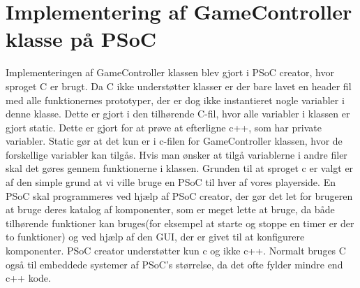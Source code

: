 \documentclass[Softwaredesign/Softwaredesign_main.tex]{subfiles}
\begin{document}
\section{Implementering af GameController klasse på PSoC}\label{sec:GameController_implementering_bilag}
Implementeringen af GameController klassen blev gjort i PSoC creator, hvor sproget C er brugt. Da C ikke understøtter klasser er der bare lavet en header fil med alle funktionernes prototyper, der er dog ikke instantieret nogle variabler i denne klasse. Dette er gjort i den tilhørende C-fil, hvor alle variabler i klassen er gjort static. Dette er gjort for at prøve at efterligne c++, som har private variabler. Static gør at det kun er i c-filen for GameController klassen, hvor de forskellige variabler kan tilgås. Hvis man ønsker at tilgå variablerne i andre filer skal det gøres gennem funktionerne i klassen. Grunden til at sproget c er valgt er af den simple grund at vi ville bruge en PSoC til hver af vores playerside. En PSoC skal programmeres ved hjælp af PSoC creator, der gør det let for brugeren at bruge deres katalog af komponenter, som er meget lette at bruge, da både tilhørende funktioner kan bruges(for eksempel at starte og stoppe en timer er der to funktioner) og ved hjælp af den GUI, der er givet til at konfigurere komponenter. PSoC creator understøtter kun c og ikke c++. Normalt bruges C også til embeddede systemer af PSoC's størrelse, da det ofte fylder mindre end c++ kode.
\end{document}
